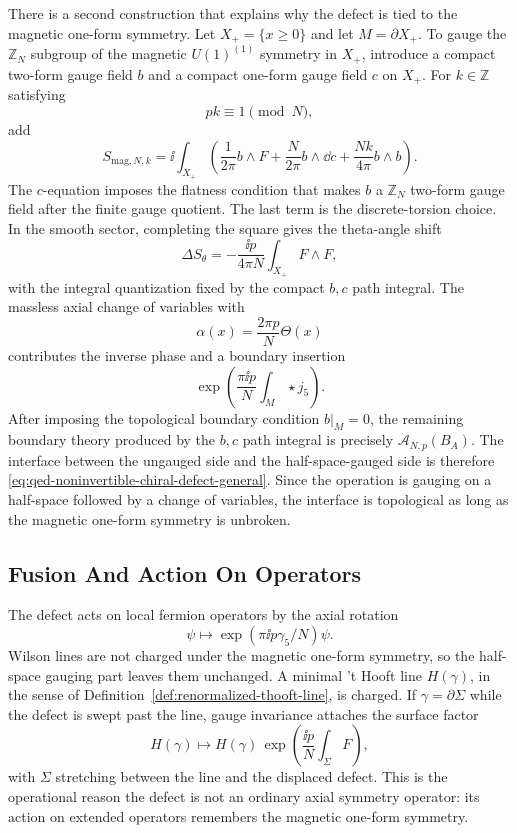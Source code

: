 There is a second construction that explains why the defect is tied to the
magnetic one-form symmetry.  Let \(X_+=\{x\ge0\}\) and let \(M=\partial X_+\).
To gauge the \(\mathbb Z_N\) subgroup of the magnetic \(U(1)^{(1)}\) symmetry
in \(X_+\), introduce a compact two-form gauge field \(b\) and a compact
one-form gauge field \(c\) on \(X_+\).  For \(k\in\mathbb Z\) satisfying
\[
  pk\equiv1\pmod N,
\]
add
\begin{equation}
  S_{\mathrm{mag},N,k}
  =
  \ii\int_{X_+}
  \left(
    \frac{1}{2\pi}b\wedge F
    +\frac{N}{2\pi}b\wedge\dd c
    +\frac{Nk}{4\pi}b\wedge b
  \right).
  \label{eq:qed-half-space-magnetic-gauging}
\end{equation}
The \(c\)-equation imposes the flatness condition that makes \(b\) a
\(\mathbb Z_N\) two-form gauge field after the finite gauge quotient.  The
last term is the discrete-torsion choice.  In the smooth sector, completing
the square gives the theta-angle shift
\[
  \Delta S_\theta
  =
  -\frac{\ii p}{4\pi N}\int_{X_+}F\wedge F,
\]
with the integral quantization fixed by the compact \(b,c\) path integral.
The massless axial change of variables with
\[
  \alpha(x)=\frac{2\pi p}{N}\Theta(x)
\]
contributes the inverse phase and a boundary insertion
\[
  \exp\left(\frac{\pi\ii p}{N}\int_M\star j_5\right).
\]
After imposing the topological boundary condition \(b|_M=0\), the remaining
boundary theory produced by the \(b,c\) path integral is precisely
\(\mathcal A_{N,p}(B_A)\).  The interface between the ungauged side and the
half-space-gauged side is therefore
\eqref{eq:qed-noninvertible-chiral-defect-general}.  Since the operation is
gauging on a half-space followed by a change of variables, the interface is
topological as long as the magnetic one-form symmetry is unbroken.

\subsection{Fusion And Action On Operators}

The defect acts on local fermion operators by the axial rotation
\[
  \psi\mapsto \exp(\pi\ii p\gamma_5/N)\psi .
\]
Wilson lines are not charged under the magnetic one-form symmetry, so the
half-space gauging part leaves them unchanged.  A minimal 't Hooft line
\(H(\gamma)\), in the sense of
Definition~\ref{def:renormalized-thooft-line}, is charged.  If
\(\gamma=\partial\Sigma\) while the defect is swept past the line, gauge
invariance attaches the surface factor
\begin{equation}
  H(\gamma)\longmapsto
  H(\gamma)\,
  \exp\left(\frac{\ii p}{N}\int_\Sigma F\right),
  \label{eq:qed-chiral-defect-action-on-thooft-line}
\end{equation}
with \(\Sigma\) stretching between the line and the displaced defect.  This is
the operational reason the defect is not an ordinary axial symmetry operator:
its action on extended operators remembers the magnetic one-form symmetry.

